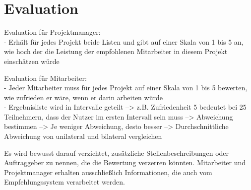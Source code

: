 \section{Evaluation}
\label{ch:methodik:evaluation}
Evaluation für Projektmanager:\\
- Erhält für jedes Projekt beide Listen und gibt auf einer Skala von 1 bis 5 an, wie hoch der die Leistung der empfohlenen Mitarbeiter in diesem Projekt einschätzen würde

Evaluation für Mitarbeiter:\\
- Jeder Mitarbeiter muss für jedes Projekt auf einer Skala von 1 bis 5 bewerten, wie zufrieden er wäre, wenn er darin arbeiten würde\\
- Ergebnisliste wird in Intervalle geteilt --> z.B. Zufriedenheit 5 bedeutet bei 25 Teilnehmern, dass der Nutzer im ersten Intervall sein muss --> Abweichung bestimmen --> Je weniger Abweichung, desto besser --> Durchschnittliche Abweichung von unilateral und bilateral vergleichen

Es wird bewusst darauf verzichtet, zusätzliche Stellenbeschreibungen oder Auftraggeber zu nennen, die die Bewertung verzerren könnten. Mitarbeiter und Projektmanager erhalten ausschließlich Informationen, die auch vom Empfehlungssystem verarbeitet werden.
